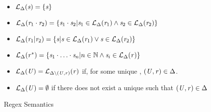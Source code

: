 \begin{figure}

\begin{itemize}
\item $\mathcal{L}_{\Delta}(\mathit{s})=\{\mathit{s}\}$
\item $\mathcal{L}_{\Delta}(\mathit{r}_1\cdot\mathit{r}_2) =
\{\mathit{s}_1\cdot\mathit{s}_2 | \mathit{s}_1\in\mathcal{L}_{\Delta}(\mathit{r}_1) \wedge \mathit{s}_2\in\mathcal{L}_{\Delta}(\mathit{r}_2)\}$
\item $\mathcal{L}_{\Delta}(\mathit{r}_1|\mathit{r}_2) =
\{\mathit{s} | \mathit{s}\in\mathcal{L}_{\Delta}(\mathit{r}_1) \vee \mathit{s}\in\mathcal{L}_{\Delta}(\mathit{r}_2)\}$
\item $\mathcal{L}_{\Delta}(\mathit{r}^*) =
\{\mathit{s}_1\cdot\ldots\cdot\mathit{s}_n | n\in\mathbb{N} \wedge \mathit{s}_i\in\mathcal{L}_{\Delta}(\mathit{r})\}$
\item $\mathcal{L}_{\Delta}(\mathit{U})=\mathcal{L}_{\Delta\setminus(\mathit{U},\mathit{r})}(\mathit{r})$ if, for some unique \Regex{}, $(\mathit{U},\mathit{r})\in\Delta$.
\item $\mathcal{L}_{\Delta}(\mathit{U})=\emptyset$
if there does not exist a unique \Regex{} such that $(\mathit{U},\mathit{r})\in\Delta$

\end{itemize}
%
%
%
%
%
\caption{Regex Semantics}
\label{fig:regex-semantics}
\end{figure}
